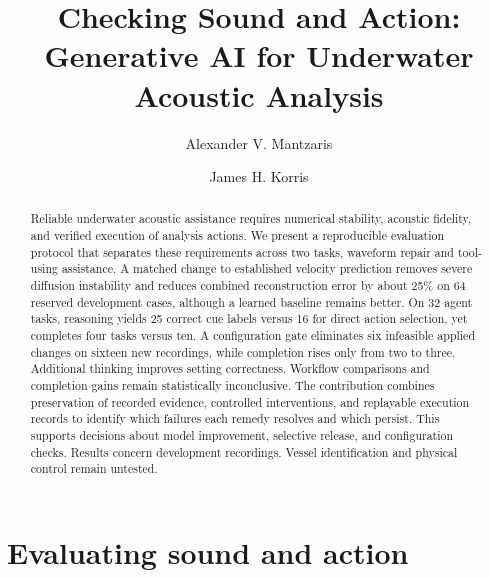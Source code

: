 \documentclass[runningheads,orivec]{llncs}
\begin{document}
\raggedbottom
\title{Checking Sound and Action: Generative AI for Underwater Acoustic Analysis}
\author{Alexander V. Mantzaris \and James H. Korris}
\maketitle


\begin{abstract}
Reliable underwater acoustic assistance requires numerical stability, acoustic fidelity, and verified execution of analysis actions. We present a reproducible evaluation protocol that separates these requirements across two tasks, waveform repair and tool-using assistance. A matched change to established velocity prediction removes severe diffusion instability and reduces combined reconstruction error by about 25\% on 64 reserved development cases, although a learned baseline remains better. On 32 agent tasks, reasoning yields 25 correct cue labels versus 16 for direct action selection, yet completes four tasks versus ten. A configuration gate eliminates six infeasible applied changes on sixteen new recordings, while completion rises only from two to three. Additional thinking improves setting correctness. Workflow comparisons and completion gains remain statistically inconclusive. The contribution combines preservation of recorded evidence, controlled interventions, and replayable execution records to identify which failures each remedy resolves and which persist. This supports decisions about model improvement, selective release, and configuration checks. Results concern development recordings. Vessel identification and physical control remain untested.
\end{abstract}

\section{Evaluating sound and action}
\end{document}
